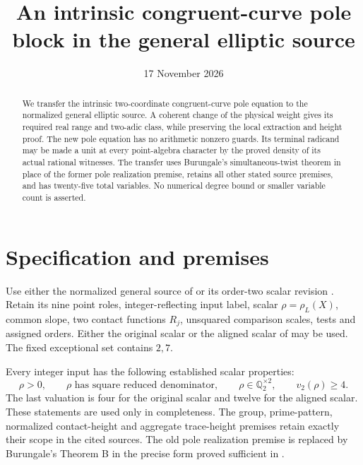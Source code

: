 \documentclass[11pt,a4paper]{article}
\title{An intrinsic congruent-curve pole block in the general elliptic source}
\author{}\date{17 November 2026}
\newcommand{\Q}{\mathbb Q}
\begin{document}
\maketitle
\begin{abstract}
We transfer the intrinsic two-coordinate congruent-curve pole equation
to the normalized general elliptic source. A coherent change of the
physical weight gives its required real range and two-adic class,
while preserving the local extraction and height proof. The new pole
equation has no arithmetic nonzero guards. Its terminal radicand may
be made a unit at every point-algebra character by the proved density
of its actual rational witnesses. The transfer uses Burungale's
simultaneous-twist theorem in place of the former pole realization
premise, retains all other stated source premises, and has twenty-five
total variables. No numerical degree bound or smaller variable count
is asserted.
\end{abstract}

\section{Specification and premises}

Use either the normalized general source of \cite{Reweighted} or its
order-two scalar revision \cite{Precision}. Retain its nine point
roles, integer-reflecting input label, scalar \(\rho=\rho_L(X)\),
common slope, two contact functions \(R_j\), unsquared comparison
scales, tests and assigned orders. Either the original scalar or
the aligned scalar of \cite{Aligned} may be used.
The fixed exceptional set contains \(2,7\).

Every integer input has the following established scalar properties:
\[
 \rho>0,\qquad \rho\text{ has square reduced denominator},\qquad
 \rho\in\Q_2^{\times2},\qquad v_2(\rho)\ge4.
\]
The last valuation is four for the original scalar and twelve for
the aligned scalar. These statements are used only in completeness.
The group, prime-pattern, normalized contact-height and aggregate
trace-height premises retain exactly their scope in the cited sources.
The old pole realization premise is replaced by Burungale's Theorem B
in the precise form proved sufficient in \cite{Intrinsic}.
\end{document}
